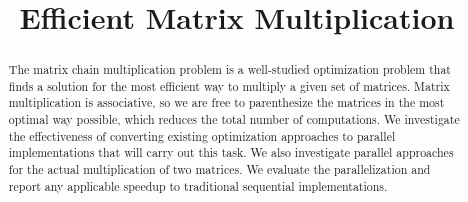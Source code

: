 \documentclass[conference,leqno]{IEEEtran}
\begin{document}
\title{Efficient Matrix Multiplication\\
}

\author{
\and
{}
\and
{}
\and
{}
\and
{}
}

\maketitle

\begin{abstract}
The matrix chain multiplication problem is a well-studied optimization problem that finds a solution for the most efficient way to multiply a given set of matrices. Matrix multiplication is associative, so we are free to parenthesize the matrices in the most optimal way possible, which reduces the total number of computations. We investigate the effectiveness of converting existing optimization approaches to parallel implementations that will carry out this task. We also investigate parallel approaches for the actual multiplication of two matrices. We evaluate the parallelization and report any applicable speedup to traditional sequential implementations.
\end{abstract}
\end{document}
